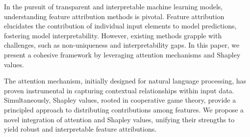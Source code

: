 \documentclass{article} %
\theoremstyle{bfnote}
\begin{document}
%	
%
%
%

In the pursuit of transparent and interpretable machine learning models, understanding feature attribution methods is pivotal. Feature attribution elucidates the contribution of individual input elements to model predictions, fostering model interpretability. However, existing methods grapple with challenges, such as non-uniqueness and interpretability gaps. In this paper, we present a cohesive framework by leveraging attention mechanisms and Shapley values. 

The attention mechanism, initially designed for natural language processing, has proven instrumental in capturing contextual relationships within input data. Simultaneously, Shapley values, rooted in cooperative game theory, provide a principled approach to distributing contributions among features. We propose a novel integration of attention and Shapley values, unifying their strengths to yield robust and interpretable feature attributions.
\end{document}
